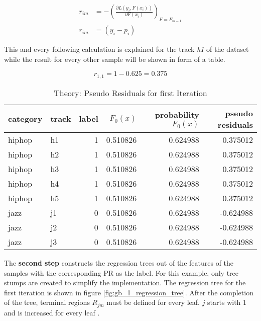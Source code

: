 \begin{equation}
    \begin{aligned}
        r_{im} &= - (\frac{\partial L(y_{i}, F(x_{i}))}{\partial F(x_{i})})_{F = F_{m - 1}}
        \\
        r_{im} &= (y_{i} - p_{i})
        \label{equ:gb_redsiduals_theory}
    \end{aligned}
\end{equation}

This and every following calculation is explained for the track \emph{h1} of the dataset while the result for 
every other sample will be shown in form of a table. 

\begin{equation*}
r_{1,1} = 1 - 0.625 = 0.375
\end{equation*}

\begin{table}[H]
    \centering
    \begin{tabular}{llrrrr}
        \toprule
        category & track &  label & \(F_{0}(x)\) &  probability \(F_{0}(x)\) &  pseudo residuals \\
        \midrule
          hiphop &    h1 &      1 & 0.510826 &         0.624988 &            0.375012 \\
          hiphop &    h2 &      1 & 0.510826 &         0.624988 &            0.375012 \\
          hiphop &    h3 &      1 & 0.510826 &         0.624988 &            0.375012 \\
          hiphop &    h4 &      1 & 0.510826 &         0.624988 &            0.375012 \\
          hiphop &    h5 &      1 & 0.510826 &         0.624988 &            0.375012 \\
            jazz &    j1 &      0 & 0.510826 &         0.624988 &           -0.624988 \\
            jazz &    j2 &      0 & 0.510826 &         0.624988 &           -0.624988 \\
            jazz &    j3 &      0 & 0.510826 &         0.624988 &           -0.624988 \\
        \bottomrule
        \end{tabular} 
    \caption{Theory: Pseudo Residuals for first Iteration}%
    \label{tbl:theory_pseudo_residuals_1_iteration}%
  \end{table} 

The \textbf{second step} constructs the regression trees out of the features of the samples with the corresponding 
PR as the label. For this example, only tree stumps are created to simplify the implementation. 
The regression tree for the first iteration is shown in figure \ref{fig:gb_1_regression_tree}. After the completion of the 
tree, terminal regions \(R_{jm}\) must be defined for every leaf. \(j\) starts with \(1\) and is increased for 
every leaf \cite[p.1195]{Friedman_2001}. 

